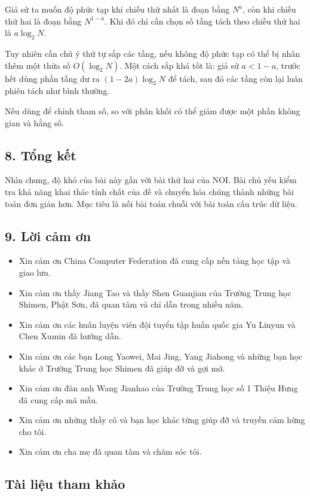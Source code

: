 \documentclass[11pt]{article}
\begin{document}
Giả sử ta muốn độ phức tạp khi chiều thứ nhất là đoạn bằng \(N^a\), còn khi
chiều thứ hai là đoạn bằng \(N^{1-a}\). Khi đó chỉ cần chọn số tầng tách theo
chiều thứ hai là \(a\log_2 N\).

Tuy nhiên cần chú ý thứ tự sắp các tầng, nếu không độ phức tạp có thể bị nhân
thêm một thừa số \(O(\log_2 N)\). Một cách sắp khá tốt là: giả sử
\(a<1-a\), trước hết dùng phần tầng dư ra \((1-2a)\log_2 N\) để tách, sau đó
các tầng còn lại luân phiên tách như bình thường.

Nếu dùng  để chỉnh tham số, so với phân khối có thể giảm được
một phần không gian và hằng số.

\subsection*{8. Tổng kết}

Nhìn chung, độ khó của bài này gần với bài thứ hai của NOI. Bài chủ yếu kiểm
tra khả năng khai thác tính chất của đề và chuyển hóa chúng thành những bài
toán đơn giản hơn. Mục tiêu là nối bài toán chuỗi với bài toán cấu trúc dữ
liệu.

\subsection*{9. Lời cảm ơn}

\begin{itemize}
  \item Xin cảm ơn China Computer Federation đã cung cấp nền tảng học tập và
  giao lưu.
  \item Xin cảm ơn thầy Jiang Tao và thầy Shen Guanjian của Trường Trung học
  Shimen, Phật Sơn, đã quan tâm và chỉ dẫn trong nhiều năm.
  \item Xin cảm ơn các huấn luyện viên đội tuyển tập huấn quốc gia Yu Linyun
  và Chen Xumin đã hướng dẫn.
  \item Xin cảm ơn các bạn Long Yaowei, Mai Jing, Yang Jiahong và những bạn
  học khác ở Trường Trung học Shimen đã giúp đỡ và gợi mở.
  \item Xin cảm ơn đàn anh Wang Jianhao của Trường Trung học số 1 Thiệu Hưng
  đã cung cấp mã mẫu.
  \item Xin cảm ơn những thầy cô và bạn học khác từng giúp đỡ và truyền cảm
  hứng cho tôi.
  \item Xin cảm ơn cha mẹ đã quan tâm và chăm sóc tôi.
\end{itemize}

\subsection*{Tài liệu tham khảo}
\end{document}
